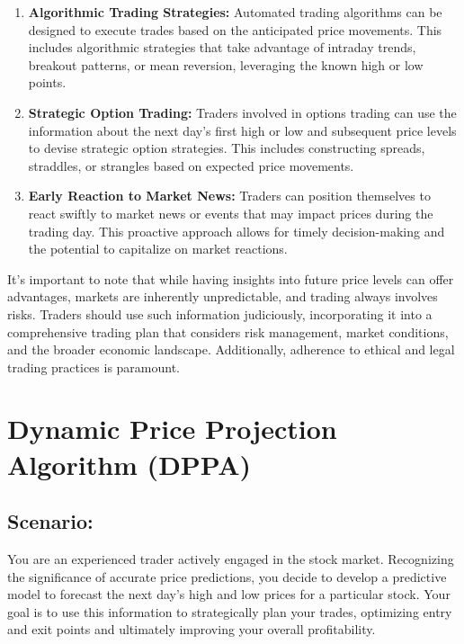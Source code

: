 \documentclass[
  letterpaper,
  DIV=11,
  numbers=noendperiod]{scrreprt}
\begin{document}
\begin{enumerate}
\item
  \textbf{Algorithmic Trading Strategies:} Automated trading algorithms
  can be designed to execute trades based on the anticipated price
  movements. This includes algorithmic strategies that take advantage of
  intraday trends, breakout patterns, or mean reversion, leveraging the
  known high or low points.
\item
  \textbf{Strategic Option Trading:} Traders involved in options trading
  can use the information about the next day's first high or low and
  subsequent price levels to devise strategic option strategies. This
  includes constructing spreads, straddles, or strangles based on
  expected price movements.
\item
  \textbf{Early Reaction to Market News:} Traders can position
  themselves to react swiftly to market news or events that may impact
  prices during the trading day. This proactive approach allows for
  timely decision-making and the potential to capitalize on market
  reactions.
\end{enumerate}

It's important to note that while having insights into future price
levels can offer advantages, markets are inherently unpredictable, and
trading always involves risks. Traders should use such information
judiciously, incorporating it into a comprehensive trading plan that
considers risk management, market conditions, and the broader economic
landscape. Additionally, adherence to ethical and legal trading
practices is paramount.

\chapter*{Dynamic Price Projection Algorithm
(DPPA)}\label{dynamic-price-projection-algorithm-dppa}


\section*{\texorpdfstring{\textbf{Scenario:}}{Scenario:}}\label{scenario}


You are an experienced trader actively engaged in the stock market.
Recognizing the significance of accurate price predictions, you decide
to develop a predictive model to forecast the next day's high and low
prices for a particular stock. Your goal is to use this information to
strategically plan your trades, optimizing entry and exit points and
ultimately improving your overall profitability.
\end{document}
